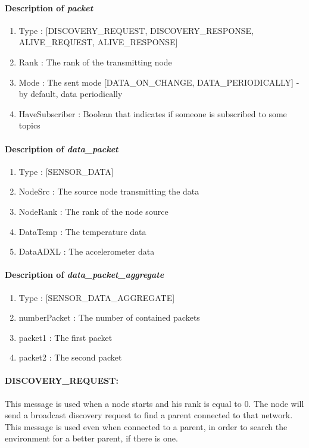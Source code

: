 \documentclass[a4paper,10pt]{article}
\begin{document}
\paragraph{Description of \textit{packet}}
\begin{enumerate}
\item Type : [DISCOVERY\_REQUEST, DISCOVERY\_RESPONSE, ALIVE\_REQUEST, ALIVE\_RESPONSE]
\item Rank : The rank of the transmitting node
\item Mode : The sent mode [DATA\_ON\_CHANGE, DATA\_PERIODICALLY] - by default, data periodically 
\item HaveSubscriber : Boolean that indicates if someone is subscribed to some topics
\end{enumerate}

\paragraph{Description of \textit{data\_packet} }
\begin{enumerate}
\item Type : [SENSOR\_DATA]
\item NodeSrc :  The source node transmitting the data
\item NodeRank : The rank of the node source
\item DataTemp : The temperature data
\item DataADXL : The accelerometer data
\end{enumerate}

\paragraph{Description of \textit{data\_packet\_aggregate} }
\begin{enumerate}
\item Type : [SENSOR\_DATA\_AGGREGATE]
\item numberPacket : The number of contained packets
\item packet1 :  The first packet
\item packet2 : The second packet
\end{enumerate}

\paragraph{DISCOVERY\_REQUEST:}  This message is used when a node starts and his rank is equal to 0. The node will send a broadcast discovery request to find a parent connected to that network. This message is used even when connected to a parent, in order to search the environment for a better parent, if there is one.
\end{document}
